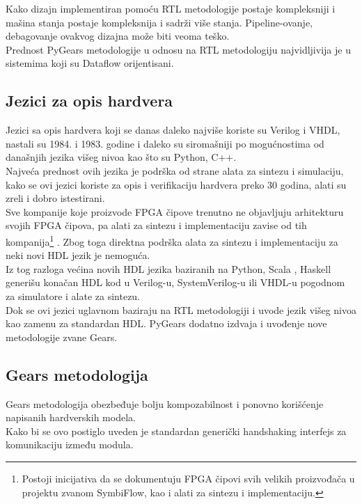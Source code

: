 Kako dizajn implementiran pomoću RTL metodologije postaje kompleksniji i mašina
stanja postaje kompleksnija i sadrži više stanja.
Pipeline-ovanje, debagovanje  ovakvog dizajna može biti veoma teško. \\
Prednost PyGears metodologije u odnosu na RTL metodologiju najvidljivija je u
sistemima koji su Dataflow orijentisani.

\subsection{Jezici za opis hardvera}

Jezici sa opis hardvera koji se danas daleko najviše koriste su Verilog i VHDL,
nastali su 1984. i 1983. godine i daleko su siromašniji po mogućnostima od današnjih
jezika višeg nivoa kao što su Python, C++. \\
Najveća prednost ovih jezika je podrška od strane alata za sintezu i simulaciju,
kako se ovi jezici koriste za opis i verifikaciju hardvera preko 30 godina,
alati su zreli i dobro istestirani. \\

Sve kompanije koje proizvode FPGA čipove trenutno ne objavljuju
arhitekturu svojih FPGA čipova, pa alati za sintezu i implementaciju zavise od
tih kompanija\footnote{Postoji inicijativa da se dokumentuju FPGA čipovi svih velikih
proizvođača u projektu zvanom SymbiFlow\cite{SymbiFlow}, kao i alati za sintezu
i implementaciju.}
.
Zbog toga direktna podrška alata za sintezu i implementaciju za neki novi HDL jezik je
nemoguća. \\

Iz tog razloga većina novih HDL jezika baziranih na
Python\cite{decaluwe2004myhdl, PyGears_OSDA}, Scala
\cite{bachrach2012chisel, SpinalHDL}, Haskell\cite{baaij2010c} generišu konačan
HDL kod u Verilog-u, SystemVerilog-u ili VHDL-u pogodnom za simulatore i alate
za sintezu. \\

Dok se ovi jezici uglavnom baziraju na RTL metodologiji i uvode jezik višeg
nivoa kao zamenu za standardan HDL.
PyGears dodatno izdvaja i uvođenje nove metodologije zvane Gears.

\subsection{Gears metodologija}
Gears metodologija obezbeđuje bolju kompozabilnost i ponovno korišćenje
napisanih hardverskih modela. \\
Kako bi se ovo postiglo uveden je standardan generički handshaking interfejs za
komunikaciju između modula.

